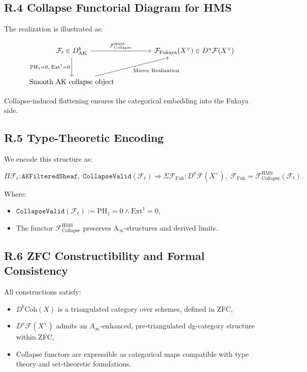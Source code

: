 \documentclass[11pt]{article}
\begin{document}
\subsection*{R.4 Collapse Functorial Diagram for HMS}

The realization is illustrated as:

\[
\begin{tikzcd}[column sep=huge, row sep=large]
\mathcal{F}_t \in D^b_{\mathrm{AK}} \arrow[r, "{\mathcal{F}_{\mathrm{Collapse}}^{\mathrm{HMS}}}"] \arrow[d, swap, "{\mathrm{PH}_1 = 0,\; \mathrm{Ext}^1 = 0}"]
& \mathcal{F}_{\mathrm{Fukaya}}(X^\vee) \in D^\pi\mathcal{F}(X^\vee) \\
\text{Smooth AK collapse object} \arrow[ru, swap, "{\text{Mirror Realization}}"] &
\end{tikzcd}
\]

Collapse-induced flattening ensures the categorical embedding into the Fukaya side.

\subsection*{R.5 Type-Theoretic Encoding}

We encode this structure as:

\[
\Pi \mathcal{F}_t : \texttt{AKFilteredSheaf},\;
\texttt{CollapseValid}(\mathcal{F}_t)
\Rightarrow
\Sigma \mathcal{F}_{\mathrm{Fuk}} : D^\pi\mathcal{F}(X^\vee),\;
\mathcal{F}_{\mathrm{Fuk}} = \mathcal{F}_{\mathrm{Collapse}}^{\mathrm{HMS}}(\mathcal{F}_t).
\]

Where:
\begin{itemize}
  \item $\texttt{CollapseValid}(\mathcal{F}_t) := \mathrm{PH}_1 = 0 \wedge \mathrm{Ext}^1 = 0$,
  \item The functor $\mathcal{F}_{\mathrm{Collapse}}^{\mathrm{HMS}}$ preserves A$_\infty$-structures and derived limits.
\end{itemize}

\subsection*{R.6 ZFC Constructibility and Formal Consistency}

All constructions satisfy:

\begin{itemize}
  \item $D^b\mathrm{Coh}(X)$ is a triangulated category over schemes, defined in ZFC,
  \item $D^\pi\mathcal{F}(X^\vee)$ admits an $A_\infty$-enhanced, pre-triangulated dg-category structure within ZFC,
  \item Collapse functors are expressible as categorical maps compatible with type theory and set-theoretic foundations.
\end{itemize}
\end{document}
